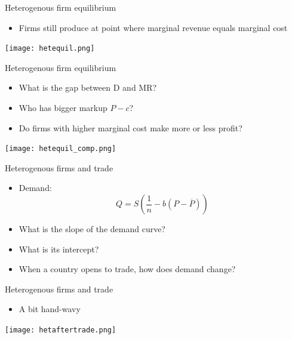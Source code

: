 \documentclass[ignorenonframetext,]{beamer}
\begin{document}
\begin{frame}{Heterogenous firm equilibrium}

    \begin{itemize}
        \item Firms still produce at point where marginal revenue equals marginal cost
    \end{itemize}
        \texttt{[image: hetequil.png]}

\end{frame}

\begin{frame}{Heterogenous firm equilibrium}

        \begin{itemize}
            \item What is the gap between D and MR?
            \item Who has bigger markup $P - c$?
            \item Do firms with higher marginal cost make more or less profit?
        \end{itemize}
        \texttt{[image: hetequil\_comp.png]}

\end{frame}

\begin{frame}{Heterogenous firms and trade}

        \begin{itemize}
            \item Demand:
            \begin{equation*}
                Q = S \left(\frac{1}{n} - b (P - \overline{P})\right)
            \end{equation*}
            \item What is the slope of the demand curve?
            \item What is its intercept?
            \item When a country opens to trade, how does demand change?
        \end{itemize}

\end{frame}
    
\begin{frame}{Heterogenous firms and trade}
    \begin{itemize}
        \item A bit hand-wavy
    \end{itemize}
    \texttt{[image: hetaftertrade.png]}
\end{frame}
\end{document}
